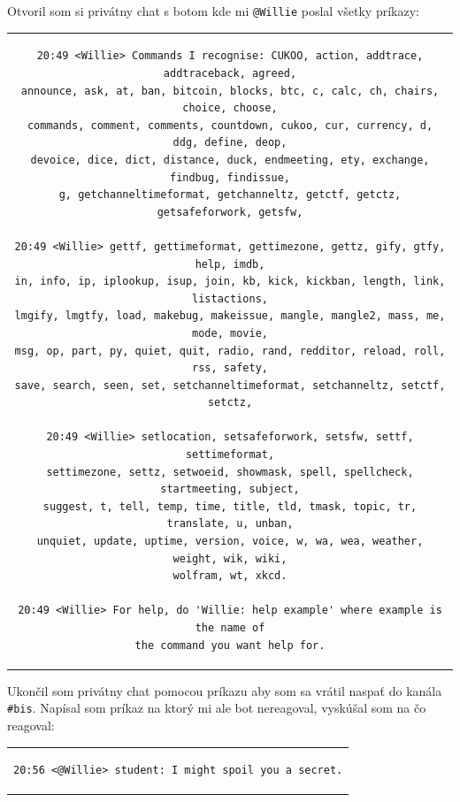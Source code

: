\documentclass[11pt,a4paper]{article}
\begin{document}
Otvoril som si privátny chat s botom kde mi \texttt{@Willie} poslal všetky príkazy:

\begin{center}
\begin{tabular}{c}
\begin{lstlisting}[language={}, basicstyle=\footnotesize]
20:49 <Willie> Commands I recognise: CUKOO, action, addtrace, addtraceback, agreed,
announce, ask, at, ban, bitcoin, blocks, btc, c, calc, ch, chairs, choice, choose,
commands, comment, comments, countdown, cukoo, cur, currency, d, ddg, define, deop,
devoice, dice, dict, distance, duck, endmeeting, ety, exchange, findbug, findissue,
g, getchanneltimeformat, getchanneltz, getctf, getctz, getsafeforwork, getsfw,

20:49 <Willie> gettf, gettimeformat, gettimezone, gettz, gify, gtfy, help, imdb,
in, info, ip, iplookup, isup, join, kb, kick, kickban, length, link, listactions,
lmgify, lmgtfy, load, makebug, makeissue, mangle, mangle2, mass, me, mode, movie,
msg, op, part, py, quiet, quit, radio, rand, redditor, reload, roll, rss, safety,
save, search, seen, set, setchanneltimeformat, setchanneltz, setctf, setctz,

20:49 <Willie> setlocation, setsafeforwork, setsfw, settf, settimeformat,
settimezone, settz, setwoeid, showmask, spell, spellcheck, startmeeting, subject,
suggest, t, tell, temp, time, title, tld, tmask, topic, tr, translate, u, unban,
unquiet, update, uptime, version, voice, w, wa, wea, weather, weight, wik, wiki,
wolfram, wt, xkcd.

20:49 <Willie> For help, do 'Willie: help example' where example is the name of
the command you want help for.
\end{lstlisting}
\end{tabular}
\end{center}

Ukončil som privátny chat pomocou príkazu  aby som sa vrátil naspať do kanála \texttt{\#bis}. Napísal som príkaz  na ktorý mi ale bot nereagoval, vyskúšal som  na čo reagoval:

\begin{center}
\begin{tabular}{c}
\begin{lstlisting}[basicstyle=\footnotesize]
20:56 <@Willie> student: I might spoil you a secret.
\end{lstlisting}
\end{tabular}
\end{center}
\end{document}
